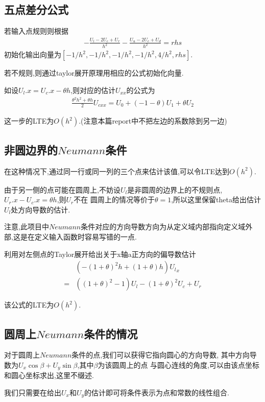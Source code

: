 \subsection{五点差分公式}

若输入点规则则根据
\begin{align*}
    -\frac{U_l-2U_c+U_r}{h^2}-\frac{U_u-2U_c+U_d}{h^2}=rhs
\end{align*}
初始化输出向量为$[-1/h^2,-1/h^2,-1/h^2,-1/h^2,4/h^2,rhs]$.

若不规则,则通过taylor展开原理用相应的公式初始化向量.

如设$U_l.x=U_c.x-\theta h$,则对应的估计$U_{xx}$的公式为
\begin{align*}
     \frac{\theta^2h^2+\theta h}{2}U_{cxx}=U_0+(-1-\theta)U_1+\theta U_2
\end{align*}

这一步的LTE为$O(h^2)$.(注意本篇report中不把左边的系数除到另一边)

\subsection{非圆边界的$Neumann$条件}

在这种情况下,通过同一行或同一列的三个点来估计该值,可以令LTE达到$O(h^2)$.

由于另一侧的点可能在圆周上,不妨设$U_l$是非圆周的边界上的不规则点,$U_r.x-U_c.x=\theta h$,则$U_r$不在
圆周上的情况等价于$\theta=1$,所以这里保留theta给出估计$U_l$处方向导数的估计.

注意,此项目中$Neumann$条件对应的方向导数方向为从定义域内部指向定义域外部,这是在定义输入函数时容易写错的一点.

利用对左侧点的Taylor展开给出关于x轴a正方向的偏导数估计
\begin{align*}
    &(-(1+\theta)^2h+(1+\theta)h){U_l}_x \\
    =&((1+\theta)^2-1)U_l-(1+\theta)^2U_c+U_r
\end{align*}

该公式的LTE为$O(h^2)$.

\subsection{圆周上$Neumann$条件的情况}

对于圆周上$Neumann$条件的点,我们可以获得它指向圆心的方向导数,
其中方向导数为$U_x \cos \beta+U_y \sin \beta$,其中$\beta$为该圆周上的点
与圆心连线的角度,可以由该点坐标和圆心坐标求出,这里不缀述.

我们只需要在给出$U_x$和$U_y$的估计即可将条件表示为点和常数的线性组合.

